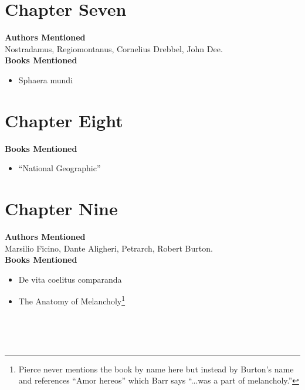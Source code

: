 \documentclass[twoside,10pt]{report}
\newcommand\fleuron{\begin{turn}{45}\Large \ding{166}\end{turn}}
\newcommand\doublefleuron{%
	\reflectbox{\fleuron}\AC\staveXLIX\reflectbox{\AC}\fleuron}
\newcommand\fleuronbar{%
	{\huge\LinearACCCXIII}\xrfill[1.3ex]{1pt}\doublefleuron\xrfill[1.3ex]{1pt}\reflectbox{\huge\LinearACCCXIII}}
\newcommand\nbvspace[1][3]{\vspace*{\stretch{#1}}}
\begin{document}
\section{Chapter Seven}
\textbf{Authors Mentioned}\\
Nostradamus, Regiomontanus, Cornelius Drebbel, John Dee.
\\

\textbf{Books Mentioned}
\begin{itemize}
\item Sphaera mundi \cite{JSB1490}
\end{itemize}

\section{Chapter Eight}
\textbf{Books Mentioned}
\begin{itemize}
\item ``National Geographic'' \cite{natgeo}
\end{itemize}

\section{Chapter Nine}
\textbf{Authors Mentioned}\\
Marsilio Ficino, Dante Aligheri, Petrarch, Robert Burton.
\\

\textbf{Books Mentioned}
\begin{itemize}
\item De vita coelitus comparanda \cite{Ficino1560}
\item The Anatomy of Melancholy\footnote{Pierce never mentions the book by name here but instead by Burton’s name and references ``Amor hereos'' which Barr says ``...was a part of melancholy.''} \cite{Burton1863}
\end{itemize}

\begin{center}
\vfill
\shadowoffset{1pt}
\shadowtext{%
{\color{Mahogany}\fontsize{60}{64}\staveLVI}}\\
\nbvspace[1]
\end{center}






\begin{center}
\vfill
\shadowoffset{1pt}
\shadowtext{%
{\color{Mahogany}\fontsize{40}{44}\staveLXIV}}\\
\nbvspace[1]
\end{center}
\end{document}

